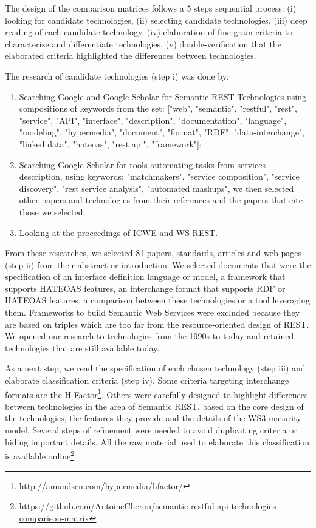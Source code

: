The design of the comparison matrices follows a 5 steps sequential process: (i) looking for candidate technologies, (ii) selecting candidate technologies, (iii) deep reading of each candidate technology, (iv) elaboration of fine grain criteria to characterize and differentiate technologies, (v) double-verification that the elaborated criteria highlighted the differences between technologies.

The research of candidate technologies (step i) was done by:

\begin{enumerate}
    \item Searching Google and Google Scholar for Semantic REST Technologies using compositions of keywords from the set: ["web", "semantic", "restful", "rest", "service", "API", "interface", "description", "documentation", "language", "modeling", "hypermedia", "document", "format", "RDF", "data-interchange", "linked data", "hateoas", "rest api", "framework"];
    \item Searching Google Scholar for tools automating tasks from services description, using keywords: "matchmakers", "service composition", "service discovery", "rest service analysis", "automated mashups", we then selected other papers and technologies from their references and the papers that cite those we selected;
    \item Looking at the proceedings of ICWE and WS-REST. 
\end{enumerate}

From these researches, we selected 81 papers, standards, articles and web pages (step ii) from their abstract or introduction. We selected documents that were the specification of an interface definition language or model, a framework that supports HATEOAS features, an interchange format that supports RDF or HATEOAS features, a comparison between these technologies or a tool leveraging them. Frameworks to build Semantic Web Services were excluded because they are based on triples which are too far from the resource-oriented design of REST. We opened our research to technologies from the 1990s to today and retained technologies that are still available today.

As a next step, we read the specification of each chosen technology (step iii) and elaborate classification criteria (step iv). Some criteria targeting interchange formats are the H Factor\footnote{\url{http://amundsen.com/hypermedia/hfactor/}}. Others were carefully designed to highlight differences between technologies in the area of Semantic REST, based on the core design of the technologies, the features they provide and the details of the WS3 maturity model. Several steps of refinement were needed to avoid duplicating criteria or hiding important details. All the raw material used to elaborate this classification is available online\footnote{\url{https://github.com/AntoineCheron/semantic-restful-api-technologies-comparison-matrix}}. 

